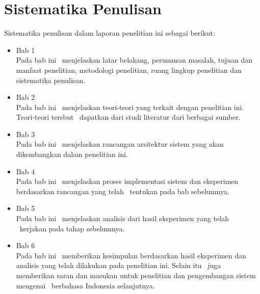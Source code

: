 \section{Sistematika Penulisan}
Sistematika penulisan dalam laporan penelitian ini sebagai berikut:
\begin{itemize}

	\item Bab 1 \babSatu \\
	Pada bab ini \saya~menjelaskan latar belakang, perumusan masalah, tujuan dan manfaat penelitian, metodologi penelitian, ruang lingkup penelitian dan sistematika penulisan.
	
	\item Bab 2 \babDua \\
	Pada bab ini \saya~menjelaskan teori-teori yang terkait dengan penelitian ini. Teori-teori tersbut \saya~dapatkan dari studi literatur dari berbagai sumber.
		
	\item Bab 3 \babTiga \\
	Pada bab ini \saya~menjelaskan rancangan arsitektur sistem yang akan dikembangkan dalam penelitian ini.
		
	\item Bab 4 \babEmpat \\
	Pada bab ini \saya~menjelaskan proses implementasi sistem dan eksperimen berdasarkan rancangan yang telah \penulis~tentukan pada bab sebelumnya.
		
	\item Bab 5 \babLima \\
	Pada bab ini \saya~menjelaskan analisis dari hasil eksperimen yang telah \saya~kerjakan pada tahap sebelumnya.
	
	\item Bab 6 \babEnam \\
	Pada bab ini \saya~memberikan kesimpulan berdasarkan hasil eksperimen dan analisis yang telah dilakukan pada penelitian ini. Selain itu \saya~juga memberikan saran dan masukan untuk penelitian dan pengembangan sistem mengenai \mer~berbahasa Indonesia selanjutnya.
	
\end{itemize}